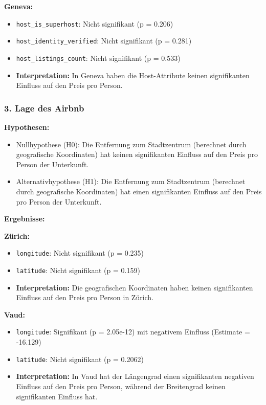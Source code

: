 \documentclass[
  journal,
]{IEEEtran}%
\providecommand{\tightlist}{%
  \setlength{\itemsep}{0pt}\setlength{\parskip}{0pt}}\usepackage{longtable,booktabs,array}
\begin{document}
\textbf{Geneva:}

\begin{itemize}
\item
  \texttt{host\_is\_superhost}: Nicht signifikant (p = 0.206)
\item
  \texttt{host\_identity\_verified}: Nicht signifikant (p = 0.281)
\item
  \texttt{host\_listings\_count}: Nicht signifikant (p = 0.533)
\item
  \textbf{Interpretation:} In Geneva haben die Host-Attribute keinen
  signifikanten Einfluss auf den Preis pro Person.
\end{itemize}

\subsubsection{3. Lage des Airbnb}\label{lage-des-airbnb}

\textbf{Hypothesen:}

\begin{itemize}
\tightlist
\item
  Nullhypothese (H0): Die Entfernung zum Stadtzentrum (berechnet durch
  geografische Koordinaten) hat keinen signifikanten Einfluss auf den
  Preis pro Person der Unterkunft.
\item
  Alternativhypothese (H1): Die Entfernung zum Stadtzentrum (berechnet
  durch geografische Koordinaten) hat einen signifikanten Einfluss auf
  den Preis pro Person der Unterkunft.
\end{itemize}

\textbf{Ergebnisse:}

\textbf{Zürich:}

\begin{itemize}
\item
  \texttt{longitude}: Nicht signifikant (p = 0.235)
\item
  \texttt{latitude}: Nicht signifikant (p = 0.159)
\item
  \textbf{Interpretation:} Die geografischen Koordinaten haben keinen
  signifikanten Einfluss auf den Preis pro Person in Zürich.
\end{itemize}

\textbf{Vaud:}

\begin{itemize}
\item
  \texttt{longitude}: Signifikant (p = 2.05e-12) mit negativem Einfluss
  (Estimate = -16.129)
\item
  \texttt{latitude}: Nicht signifikant (p = 0.2062)
\item
  \textbf{Interpretation:} In Vaud hat der Längengrad einen
  signifikanten negativen Einfluss auf den Preis pro Person, während der
  Breitengrad keinen signifikanten Einfluss hat.
\end{itemize}
\end{document}

